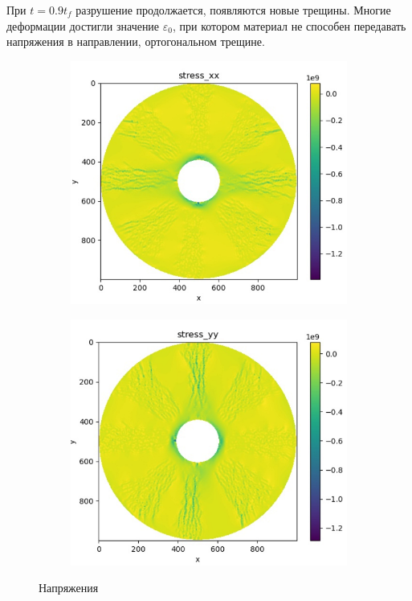 \documentclass[12pt, a4paper]{article}
\begin{document}
При $t=0.9t_f$ разрушение продолжается, появляются новые трещины. Многие деформации достигли	значение $\varepsilon_0$, при котором материал не способен передавать напряжения в направлении, ортогональном трещине.
 \begin{figure}[H]
	\centering
	\begin{subfigure}[H]{0.38\textwidth}
		\includegraphics[width=\textwidth]{stressx_2tf}
	\end{subfigure}
	\qquad\qquad
	\begin{subfigure}[H]{0.38\textwidth}
		\includegraphics[width=\textwidth]{stressy_2tf}
	\end{subfigure}	
	\caption{Напряжения}
\end{figure}	
\end{document}
